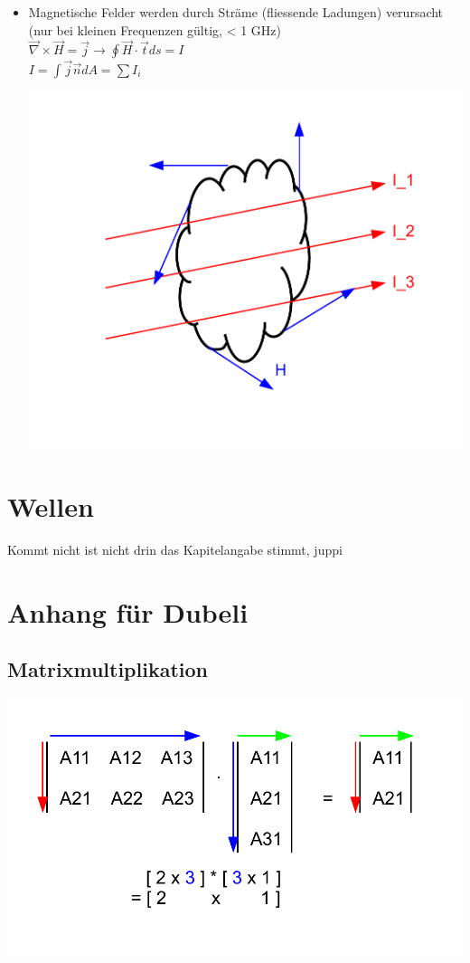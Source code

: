 \documentclass[a4paper]{scrartcl}
\begin{document}
\begin{itemize}
\item Magnetische Felder werden durch Sträme (fliessende Ladungen) verursacht
(nur bei kleinen Frequenzen gültig, < 1 GHz)\\
$\vec \nabla \times \vec H = \vec j \rightarrow \oint \vec H \cdot \vec t ds =
I$\\
$I=\int \vec j \vec n dA = \sum I_i$
\begin{center}
\includegraphics[scale=0.5]{images/maxwell_4.pdf}
\end{center}

\end{itemize}


\section{Wellen}

Kommt nicht ist nicht drin das Kapitelangabe stimmt, juppi

\section{Anhang für Dubeli}
	\subsection{Matrixmultiplikation}
		\includegraphics[scale=0.5]{images/matrixmultiplikation.pdf}
\end{document}
